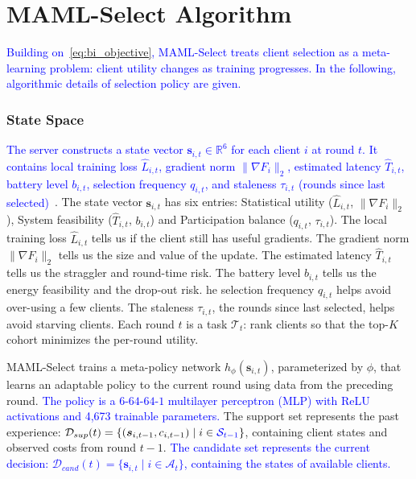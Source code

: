 \documentclass[journal]{IEEEtran}
\newcommand{\revision}[1]{\textcolor{blue}{#1}}
\begin{document}
\section{MAML-Select Algorithm}
\revision{Building on~\eqref{eq:bi_objective}, MAML-Select treats client selection as a meta-learning problem: client utility changes as training progresses. In the following, algorithmic details of selection policy are given.}

\subsubsection{State Space}
\revision{The server constructs a state vector $\bm{s}_{i,t} \in \mathbb{R}^6$ for each client $i$ at round $t$. It contains local training loss $\hat{L}_{i,t}$, gradient norm $\|\nabla F_i\|_2$, estimated latency $\hat{T}_{i,t}$, battery level $b_{i,t}$, selection frequency $q_{i,t}$, and staleness $\tau_{i,t}$ (rounds since last selected)}~\cite{pan2024contextual,xu2024federated}. The state vector $\bm{s}_{i,t}$ has six entries: Statistical utility ($\hat{L}_{i,t}$, $\lVert\nabla F_{i}\rVert_{2}$), System feasibility ($\hat{T}_{i,t}$, $b_{i,t}$) and Participation balance ($q_{i,t}$, $\tau_{i,t}$). The local training loss $\hat{L}_{i,t}$ tells us if the client still has useful gradients. The gradient norm $\lVert\nabla F_{i}\rVert_{2}$ tells us the size and value of the update. The estimated latency $\hat{T}_{i,t}$ tells us the straggler and round-time risk. The battery level $b_{i,t}$ tells us the energy feasibility and the drop-out risk. he selection frequency $q_{i,t}$ helps avoid over-using a few clients. The staleness $\tau_{i,t}$, the rounds since last selected, helps avoid starving clients.
Each round $t$ is a task $\mathcal{T}_t$: rank clients so that the top-$K$ cohort minimizes the per-round utility.%

MAML-Select trains a meta-policy network $h_\phi(\bm{s}_{i,t})$, parameterized by $\phi$, that learns an adaptable policy to the current round using data from the preceding round. \revision{The policy is a $6$-$64$-$64$-$1$ multilayer perceptron (MLP) with ReLU activations and 4,673 trainable parameters.} The support set represents the past experience: $\mathcal{D}_{sup}(t) = \{(\bm{s}_{i,t-1}, c_{i,t-1}) \mid i \in \revision{\mathcal{S}_{t-1}}\}$, containing client states and observed costs from round $t-1$. \revision{The candidate set represents the current decision: $\mathcal{D}_{cand}(t) = \{\bm{s}_{i,t} \mid i \in \mathcal{A}_t\}$, containing the states of available clients.}
\end{document}
